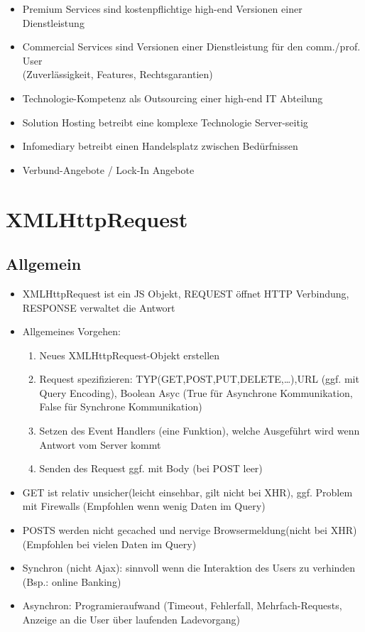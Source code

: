 \documentclass{article} %
\begin{document}
			\begin{itemize}
				\item Premium Services sind kostenpflichtige high-end Versionen einer Dienstleistung
				\item Commercial Services sind Versionen einer Dienstleistung für den comm./prof. User\\
				(Zuverlässigkeit, Features, Rechtsgarantien)
				\item Technologie-Kompetenz als Outsourcing einer high-end IT Abteilung
				\item Solution Hosting betreibt eine komplexe Technologie Server-seitig
				\item Infomediary betreibt einen Handelsplatz zwischen Bedürfnissen
				\item Verbund-Angebote / Lock-In Angebote
			\end{itemize}
			
			
			
			
	\section{XMLHttpRequest}
	\subsection{Allgemein}
	\begin{itemize}
		\item XMLHttpRequest ist ein JS Objekt, REQUEST öffnet HTTP Verbindung, RESPONSE verwaltet die Antwort
		\item Allgemeines Vorgehen:
		\begin{enumerate}
			\item Neues XMLHttpRequest-Objekt erstellen
			\item Request spezifizieren: TYP(GET,POST,PUT,DELETE,\dots),URL (ggf. mit Query Encoding), Boolean Asyc (True für Asynchrone Kommunikation, False für Synchrone Kommunikation)
			\item Setzen des Event Handlers (eine Funktion), welche Ausgeführt wird wenn Antwort vom Server kommt
			\item Senden des Request ggf. mit Body (bei POST leer)
		\end{enumerate}
		\item GET ist relativ unsicher(leicht einsehbar, gilt nicht bei XHR), ggf. Problem mit Firewalls (Empfohlen wenn wenig Daten im Query)
		\item POSTS werden nicht gecached und nervige Browsermeldung(nicht bei XHR) (Empfohlen bei vielen Daten im Query)
		\item Synchron (nicht Ajax): sinnvoll wenn die Interaktion des Users zu verhinden (Bsp.: online Banking)
		\item Asynchron: Programieraufwand (Timeout, Fehlerfall, Mehrfach-Requests, Anzeige an die User über laufenden Ladevorgang)
	\end{itemize}
\end{document}
